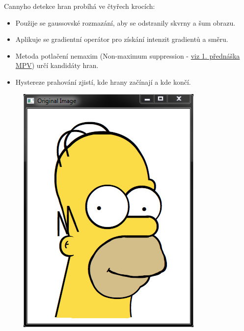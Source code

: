 \documentclass[12pt, a4paper]{article}
\begin{document}
{\par{Cannyho detekce hran probíhá ve čtyřech krocích:
\begin{itemize}
	\item Použije se gaussovské rozmazání, aby se odstranily skvrny a šum obrazu.
	\item Aplikuje se gradientní operátor pro získání intenzit gradientů a směru.
	\item Metoda potlačení nemaxim (Non-maximum suppression - \href{http://www.kky.zcu.cz/cs/courses/mpv}{viz 1. přednáška MPV}) určí kandidáty hran.
	\item Hystereze prahování zjistí, kde hrany začínají a kde končí.		
\end{itemize}}


\newpage


\begin{figure}[!ht]
	\centering
	\begin{minipage}[t]{0.49\textwidth}
		\includegraphics[width = \textwidth]{OriginalImg.png}

\end{minipage}
\end{figure}}
\end{document}
